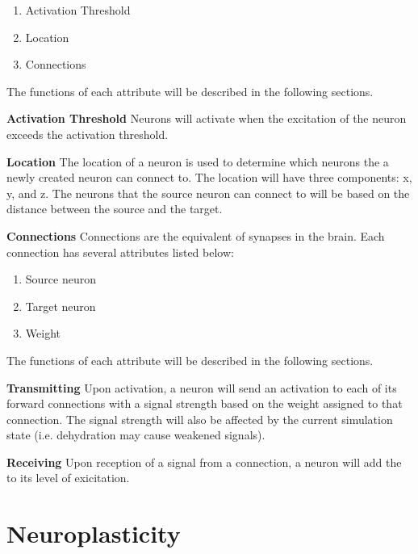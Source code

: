 \documentclass{article} %
\begin{document}
        \begin{enumerate}[noitemsep]
            \item Activation Threshold 
            \item Location
            \item Connections
        \end{enumerate}

        The functions of each attribute will be described in the following sections.\newline

        \textbf{Activation Threshold} Neurons will activate when the excitation of the neuron exceeds the activation threshold.\newline

        \textbf{Location} The location of a neuron is used to determine which neurons the a newly created neuron can connect to. The location will have three components: x, y, and z. The neurons that the source neuron can connect to will be based on the distance between the source and the target.\newline

        \textbf{Connections} Connections are the equivalent of synapses in the brain. Each connection has several attributes listed below: 

        \begin{enumerate}[noitemsep]
            \item Source neuron
            \item Target neuron 
            \item Weight
        \end{enumerate}
        The functions of each attribute will be described in the following sections.\newline

        \textbf{Transmitting} Upon activation, a neuron will send an activation to each of its forward connections with a signal strength based on the weight assigned to that connection. The signal strength will also be affected by the current simulation state (i.e. dehydration may cause weakened signals).\newline

        \textbf{Receiving} Upon reception of a signal from a connection, a neuron will add the to its level of exicitation.\newline


    \section{Neuroplasticity}
\end{document}

